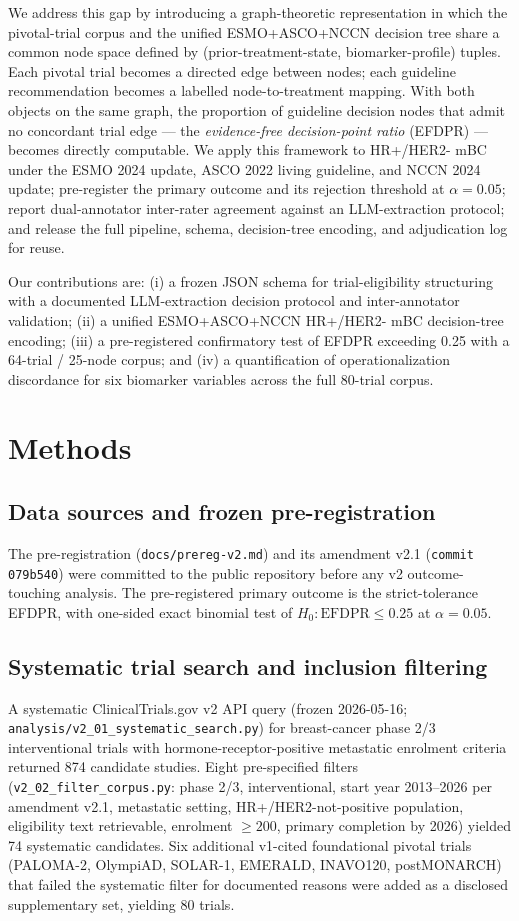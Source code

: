 \documentclass[11pt,a4paper]{article}
\begin{document}
We address this gap by introducing a graph-theoretic representation in which the pivotal-trial corpus and the unified ESMO+ASCO+NCCN decision tree share a common node space defined by (prior-treatment-state, biomarker-profile) tuples. Each pivotal trial becomes a directed edge between nodes; each guideline recommendation becomes a labelled node-to-treatment mapping. With both objects on the same graph, the proportion of guideline decision nodes that admit no concordant trial edge --- the \emph{evidence-free decision-point ratio} (EFDPR) --- becomes directly computable. We apply this framework to HR+/HER2- mBC under the ESMO 2024 update, ASCO 2022 living guideline, and NCCN 2024 update; pre-register the primary outcome and its rejection threshold at $\alpha = 0.05$; report dual-annotator inter-rater agreement against an LLM-extraction protocol; and release the full pipeline, schema, decision-tree encoding, and adjudication log for reuse.

Our contributions are: (i) a frozen JSON schema for trial-eligibility structuring with a documented LLM-extraction decision protocol and inter-annotator validation; (ii) a unified ESMO+ASCO+NCCN HR+/HER2- mBC decision-tree encoding; (iii) a pre-registered confirmatory test of EFDPR exceeding 0.25 with a 64-trial / 25-node corpus; and (iv) a quantification of operationalization discordance for six biomarker variables across the full 80-trial corpus.

\section{Methods}\label{sec:methods}

\subsection{Data sources and frozen pre-registration}
The pre-registration (\texttt{docs/prereg-v2.md}) and its amendment v2.1 (\texttt{commit 079b540}) were committed to the public repository before any v2 outcome-touching analysis. The pre-registered primary outcome is the strict-tolerance EFDPR, with one-sided exact binomial test of $H_0: \mathrm{EFDPR} \le 0.25$ at $\alpha = 0.05$.

\subsection{Systematic trial search and inclusion filtering}
A systematic ClinicalTrials.gov v2 API query (frozen 2026-05-16; \texttt{analysis/v2\_01\_systematic\_search.py}) for breast-cancer phase 2/3 interventional trials with hormone-receptor-positive metastatic enrolment criteria returned 874 candidate studies. Eight pre-specified filters (\texttt{v2\_02\_filter\_corpus.py}: phase 2/3, interventional, start year 2013--2026 per amendment v2.1, metastatic setting, HR+/HER2-not-positive population, eligibility text retrievable, enrolment $\ge 200$, primary completion by 2026) yielded 74 systematic candidates. Six additional v1-cited foundational pivotal trials (PALOMA-2, OlympiAD, SOLAR-1, EMERALD, INAVO120, postMONARCH) that failed the systematic filter for documented reasons were added as a disclosed supplementary set, yielding 80 trials.
\end{document}
